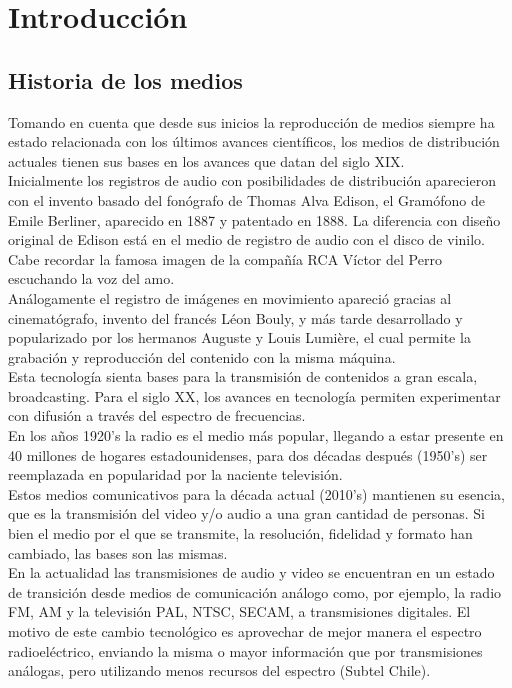 \chapter{Introducción}
\section{Historia de los medios}
Tomando en cuenta que desde sus inicios la reproducción de medios siempre ha estado relacionada con los últimos avances científicos, los medios de distribución actuales tienen sus bases en los avances que datan  del siglo XIX.\\
Inicialmente los registros de audio con posibilidades de distribución aparecieron con el invento basado del fonógrafo de Thomas Alva Edison, el Gramófono de Emile Berliner, aparecido en 1887 y patentado en 1888. La diferencia con diseño original de Edison está en el medio de registro de audio con el disco de vinilo. Cabe recordar la famosa imagen de la compañía RCA Víctor del Perro escuchando la voz del amo.\\

Análogamente el registro de imágenes en movimiento apareció gracias al cinematógrafo, invento del francés Léon Bouly, y más tarde desarrollado y popularizado por los hermanos Auguste y Louis Lumière, el cual permite la grabación y reproducción del contenido con la misma máquina.\\

Esta tecnología sienta bases para la transmisión de contenidos a gran escala, broadcasting. Para el siglo XX, los avances en tecnología permiten experimentar con difusión a través del espectro de frecuencias.\\

 En los años 1920’s la radio es el medio más popular, llegando a estar presente en 40 millones de hogares estadounidenses, para dos décadas después (1950’s) ser reemplazada en popularidad por la naciente televisión.\\

	Estos medios comunicativos para la década actual (2010’s) mantienen su esencia, que es la transmisión del video y/o audio a una gran cantidad de personas. Si bien el medio por el que se transmite, la resolución, fidelidad y formato han cambiado, las bases son las mismas.\\
	
En la actualidad las transmisiones de audio y video se encuentran en un estado de transición desde medios de comunicación análogo como, por ejemplo, la radio FM, AM y la televisión PAL, NTSC, SECAM, a transmisiones digitales. El motivo de este cambio tecnológico es aprovechar de mejor manera el espectro radioeléctrico, enviando la misma o mayor información que por transmisiones análogas, pero utilizando menos recursos del espectro (Subtel Chile).\\

